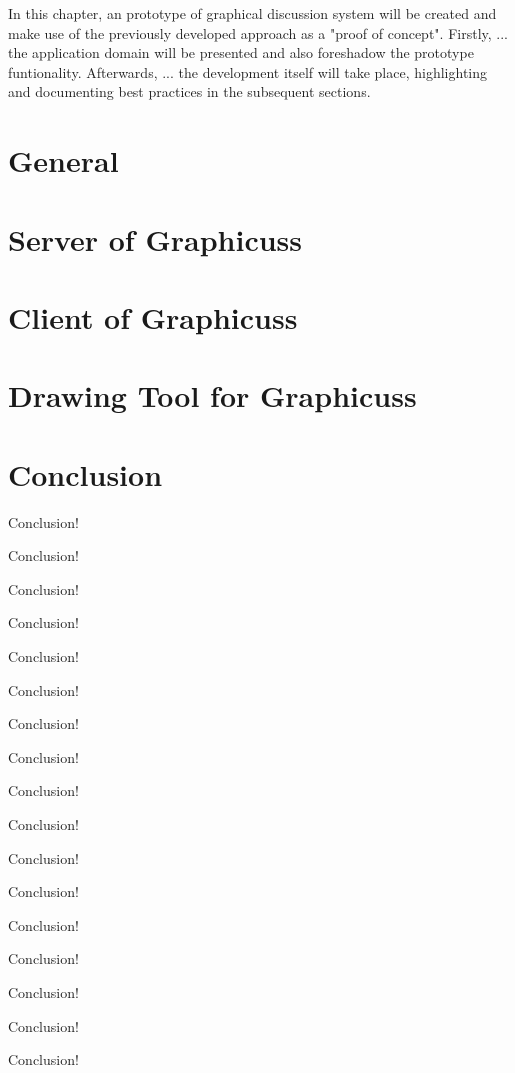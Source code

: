 In this chapter, an prototype of graphical discussion system will be created and make use of the previously developed approach as a "proof of concept". Firstly, ... the application domain will be presented and also foreshadow the prototype funtionality. Afterwards, ... the development itself will take place, highlighting and documenting best practices in the subsequent sections.


\section{General}


\section{Server of Graphicuss}


\section{Client of Graphicuss}


\section{Drawing Tool for Graphicuss}


% 

\section{Conclusion}
Conclusion!

Conclusion!

Conclusion!

Conclusion!

Conclusion!

Conclusion!

Conclusion!

Conclusion!

Conclusion!


Conclusion!

Conclusion!

Conclusion!

Conclusion!


Conclusion!

Conclusion!

Conclusion!

Conclusion!

